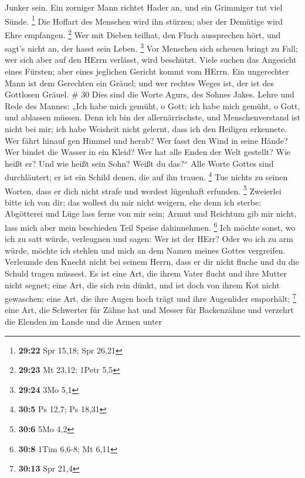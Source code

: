 Junker sein.  Ein zorniger Mann richtet Hader an, und ein
Grimmiger tut viel Sünde. \footnote{\textbf{29:22} Spr 15,18; Spr 26,21}
 Die Hoffart des Menschen wird ihn stürzen; aber der
Demütige wird Ehre empfangen. \footnote{\textbf{29:23} Mt 23,12; 1Petr
  5,5}  Wer mit Dieben teilhat, den Fluch aussprechen hört,
und sagt's nicht an, der hasst sein Leben. \footnote{\textbf{29:24} 3Mo
  5,1}  Vor Menschen sich scheuen bringt zu Fall; wer sich
aber auf den HErrn verlässt, wird beschützt.  Viele suchen
das Angesicht eines Fürsten; aber eines jeglichen Gericht kommt vom
HErrn.  Ein ungerechter Mann ist dem Gerechten ein Gräuel;
und wer rechtes Weges ist, der ist des Gottlosen Gräuel. \# 30
 Dies sind die Worte Agurs, des Sohnes Jakes. Lehre und Rede
des Mannes: „Ich habe mich gemüht, o Gott; ich habe mich gemüht, o Gott,
und ablassen müssen.  Denn ich bin der allernärrischste, und
Menschenverstand ist nicht bei mir;  ich habe Weisheit nicht
gelernt, dass ich den Heiligen erkennete.  Wer fährt hinauf
gen Himmel und herab? Wer fasst den Wind in seine Hände? Wer bindet die
Wasser in ein Kleid? Wer hat alle Enden der Welt gestellt? Wie heißt er?
Und wie heißt sein Sohn? Weißt du das?{}``  Alle Worte
Gottes sind durchläutert; er ist ein Schild denen, die auf ihn trauen.
\footnote{\textbf{30:5} Ps 12,7; Ps 18,31}  Tue nichts zu
seinen Worten, dass er dich nicht strafe und werdest lügenhaft erfunden.
\footnote{\textbf{30:6} 5Mo 4,2}  Zweierlei bitte ich von
dir; das wollest du mir nicht weigern, ehe denn ich sterbe: 
Abgötterei und Lüge lass ferne von mir sein; Armut und Reichtum gib mir
nicht, lass mich aber mein beschieden Teil Speise dahinnehmen.
\footnote{\textbf{30:8} 1Tim 6,6-8; Mt 6,11}  Ich möchte
sonst, wo ich zu satt würde, verleugnen und sagen: Wer ist der HErr?
Oder wo ich zu arm würde, möchte ich stehlen und mich an dem Namen
meines Gottes vergreifen.  Verleumde den Knecht nicht bei
seinem Herrn, dass er dir nicht fluche und du die Schuld tragen müssest.
 Es ist eine Art, die ihrem Vater flucht und ihre Mutter
nicht segnet;  eine Art, die sich rein dünkt, und ist doch
von ihrem Kot nicht gewaschen;  eine Art, die ihre Augen
hoch trägt und ihre Augenlider emporhält; \footnote{\textbf{30:13} Spr
  21,4}  eine Art, die Schwerter für Zähne hat und Messer
für Backenzähne und verzehrt die Elenden im Lande und die Armen unter
